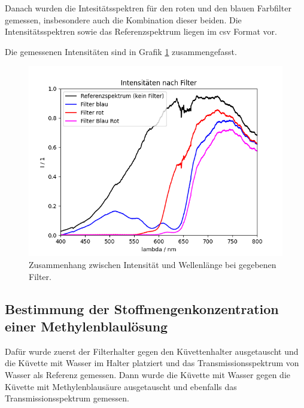 \documentclass{article}
\begin{document}
Danach wurden die Intesitätsspektren für den roten und den blauen Farbfilter gemessen, insbesondere auch die Kombination dieser beiden. Die Intensitätsspektren sowie das Referenzspektrum liegen im csv Format vor.



Die gemessenen Intensitäten sind in Grafik \ref{fig:I_Methyl} zusammengefasst.

\begin{figure}[H]
\centering
\caption{Zusammenhang zwischen Intensität und Wellenlänge bei gegebenen Filter.}
\label{fig:I_Methyl}
\includegraphics[scale=0.7]{FF_Intensitaeten.png}
\end{figure}





\subsection{Bestimmung der Stoffmengenkonzentration einer Methylenblaulösung}

Dafür wurde zuerst der Filterhalter gegen den Küvettenhalter ausgetauscht und die Küvette mit Wasser im Halter platziert und das Transmissionsspektrum von Wasser als Referenz gemessen. Dann wurde die Küvette mit Wasser gegen die Küvette mit Methylenblausäure ausgetauscht und ebenfalls das Transmissionsspektrum gemessen.
\end{document}
